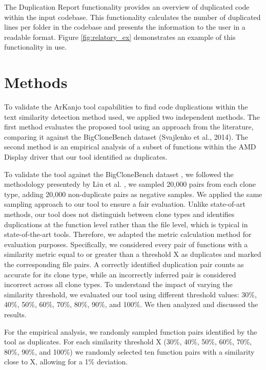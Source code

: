 \documentclass[conference]{IEEEtran}
\begin{document}
The Duplication Report functionality provides an overview of
duplicated code within the input codebase. This functionality calculates the number of
duplicated lines per folder in the codebase and presents the information to the user in
a readable format. Figure \ref{fig:relatory_ex} demonstrates an example of this functionality in use.

\section{Methods}

To validate the ArKanjo tool capabilities to find code duplications within the 
text similarity detection method used, we applied two independent
methods. The first method evaluates the proposed tool using an approach from the literature,
comparing it against the BigCloneBench dataset (Svajlenko et al., 2014). The second
method is an empirical analysis of a subset of functions within the AMD Display driver
that our tool identified as duplicates. 

To validate the tool against the BigCloneBench dataset \cite{bigclonebench}, we followed
the methodology presentedy by Liu et al. \cite{tailor}, we sampled 20,000 pairs from each clone
type, adding 20,000 non-duplicate pairs as negative samples. We applied the same sampling
approach to our tool to ensure a fair evaluation.
Unlike state-of-art methods, our tool does not distinguish between clone types and
identifies duplications at the function level rather than the file level, which is typical in
state-of-the-art tools. Therefore, we adapted the metric calculation method for evaluation
purposes. Specifically, we considered every pair of functions with a similarity metric
equal to or greater than a threshold X as duplicates and marked the corresponding file
pairs. A correctly identified duplication pair counts as accurate for its clone type, while
an incorrectly inferred pair is considered incorrect across all clone types.
To understand the impact of varying the similarity threshold, we evaluated our tool using
different threshold values: 30\%, 40\%, 50\%, 60\%, 70\%, 80\%, 90\%, and 100\%. We then analyzed
and discussed the results.

For the empirical analysis, we randomly sampled function pairs identified by the tool as
duplicates. For each similarity threshold X (30\%, 40\%, 50\%, 60\%, 70\%, 80\%, 90\%, and 100\%) 
we randomly selected ten function pairs with a similarity close to X, allowing for a 1\%
deviation.
\end{document}
